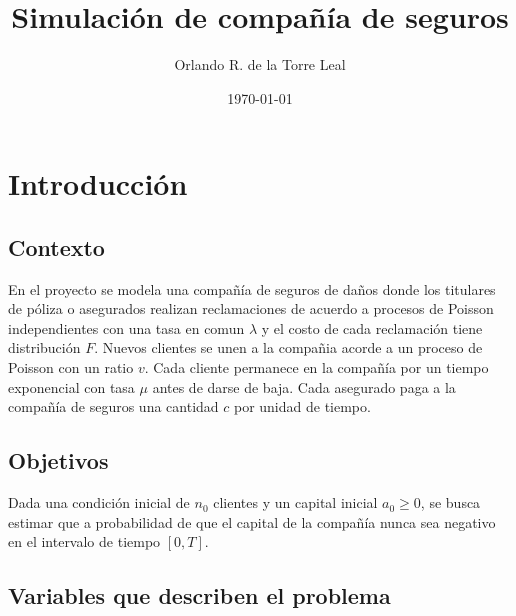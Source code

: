 \documentclass[12pt, a4paper]{article}
\title{Simulación de compañía de seguros}
\author{Orlando R. de la Torre Leal}
\date{\today}
\begin{document}
\maketitle

\section{Introducción} \label{S1}
\subsection*{Contexto}
En el proyecto se modela una compañía de seguros de daños donde los titulares de póliza o asegurados realizan reclamaciones
de acuerdo a procesos de Poisson independientes con una tasa en comun $\lambda$ y el costo de cada reclamación tiene distribución
$F$. Nuevos clientes se unen a la compañia acorde a un proceso de Poisson con un ratio $v$. Cada cliente permanece en la compañía
por un tiempo exponencial con tasa $\mu$ antes de darse de baja. Cada asegurado paga a la compañía de seguros una cantidad $c$ por 
unidad de tiempo. 

\subsection*{Objetivos}
Dada una condición inicial de $n_0$ clientes y un capital inicial $a_0 \geq 0$, se busca estimar que a probabilidad de que el 
capital de la compañía nunca sea negativo en el intervalo de tiempo $[0, T]$.

\subsection*{Variables que describen el problema}
\end{document}
